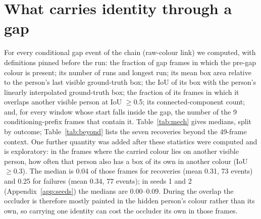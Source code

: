 \documentclass{article} %
\newcommand{\rev}[1]{{\color{blue}#1}}
\begin{document}
\rev{\section{What carries identity through a gap}
\label{app:mech}
For every conditional gap event of the chain (raw-colour link) we computed, with definitions
pinned before the run: the fraction of gap frames in which the pre-gap colour is present; its
number of runs and longest run; its mean box area relative to the person's last visible
ground-truth box; the IoU of its box with the person's linearly interpolated ground-truth
box; the fraction of its frames in which it overlaps another visible person at IoU
$\geq$0.5; its connected-component count; and, for every window whose start falls inside the
gap, the number of the 9 conditioning-prefix frames that contain it.
Table~\ref{tab:mech} gives medians, split by outcome; Table~\ref{tab:beyond} lists the seven
recoveries beyond the 49-frame context. One further quantity was added after these
statistics were computed and is exploratory: in the frames where the carried colour lies on
another visible person, how often that person also has a box of its own in another colour
(IoU $\geq$0.3). The median is 0.04 of those frames for recoveries (mean 0.31, 73 events) and
0.25 for failures (mean 0.34, 77 events); in seeds 1 and 2 (Appendix~\ref{app:seeds}) the
medians are 0.00--0.09. During the overlap the occluder is therefore mostly painted in the
hidden person's colour rather than its own, so carrying one identity can cost the occluder
its own in those frames.}
\end{document}
